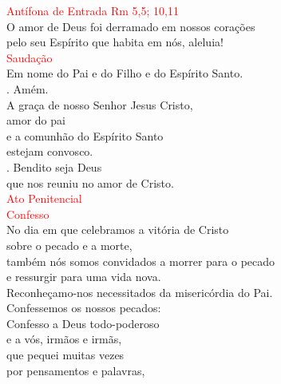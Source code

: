\documentclass{book}
\begin{document}
\begin{flushleft}

    \vspace{0.5cm}
    \textcolor{red}{Antífona de Entrada}
    \hspace{\fill}
    \textcolor{red}{Rm 5,5; 10,11}
    \vspace{0.2cm} \\
    O amor de Deus foi derramado em nossos corações \\
    pelo seu Espírito que habita em nós, aleluia!
    \vspace{0.2cm} \\
    \textcolor{red}{Saudação}
    \vspace{0.2cm}\\
    Em nome do Pai e do Filho e do Espírito Santo. \\
    {\color{red} \Rbar.} Amém. \\
    A graça de nosso Senhor Jesus Cristo, \\
    amor do pai \\
    e a comunhão do Espírito Santo \\
    estejam convosco. \\
    {\color{red} \Rbar.} Bendito seja Deus \\
    que nos reuniu no amor de Cristo.
    \vspace{0.2cm} \\
    \textcolor{red}{Ato Penitencial}
    \vspace{0.2cm} \\
    \textcolor{red}{Confesso}
    \vspace{0.2cm} \\
    No dia em que celebramos a vitória de Cristo \\
    sobre o pecado e a morte, \\
    também nós somos convidados a morrer para o pecado \\
    e ressurgir para uma vida nova. \\
    Reconheçamo-nos necessitados da misericórdia do Pai.
    \vspace{0.1cm} \\
    Confessemos os nossos pecados:
    \vspace{0.1cm} \\
    Confesso a Deus todo-poderoso \\
    e a vós, irmãos e irmãs, \\
    que pequei muitas vezes \\
    por pensamentos e palavras, \\

\end{flushleft}
\end{document}

